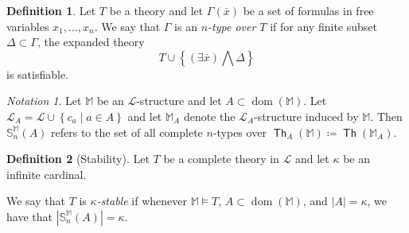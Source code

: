 \documentclass[10pt,letterpaper,cm]{nupset}
\theoremstyle{definition}
\newtheorem{definition}{Definition}
\theoremstyle{theorem}
\theoremstyle{remark}
\newtheorem*{notation}{Notation}
\newcommand{\M}{\mathbb M}
\renewcommand{\L}{\mathcal L}
\renewcommand{\S}{\mathbb S}
\newcommand{\1}{\mathbb{1}}
\newcommand{\0}{\vec 0}
\DeclareMathOperator{\dom}{dom}
\DeclareMathOperator{\thh}{\mathsf{Th}}
\begin{document}
\begin{definition}
Let $T$ be a theory and let $\Gamma(\bar{x})$ be a set of formulas in free variables $x_1, \ldots, x_n$. We say that $\Gamma$ is an \textit{$n$-type over $T$} if for any finite subset $\Delta \subset \Gamma$, the expanded theory $$T\cup \left\{\left(\exists{\bar{x}}\right)\bigwedge{\Delta}\right\}$$ is satisfiable.
\end{definition}

\begin{notation}
Let $\M$ be an $\L$-structure and let $A\subset \dom(\M)$. Let $\L_A = \L \cup \left\{c_a \mid a \in A\right\}$ and let $\M_A$ denote the  $\L_A$-structure induced by $\M$.  Then  $\S_n^{\M}(A)$ refers to the set of all complete $n$-types over $\thh_A(\M) \coloneqq \thh(\M_A)$.
\end{notation}
\begin{definition}[Stability] Let $T$ be a complete theory in $\L$ and let $\kappa$ be an infinite cardinal.  
\begin{comment}
\begin{enumerate}[label=(\roman*)]
\item Let $p$ be the set of all $\L_A$ formulas in free variables $x_1, \ldots, x_n$. We say that $p$ is \textit{$n$-type} if $p \cup \thh_A(\M)$ is satisfiable.

In this case, we call $p$ \textit{complete} if $\theta \in p$ or $\neg{\theta}$ for any $\L_A$-formula $\theta$ with free variables among $x_1, \ldots, x_n$. 
\item
\end{enumerate}
\end{comment}
We say that $T$ is \textit{$\kappa$-stable} if whenever $\M \models T$, $A\subset \dom(\M)$, and $\left\lvert{A}\right\rvert = \kappa$, we have that $\left\lvert{\S_n^{\M}(A)}\right\rvert = \kappa$.
\end{definition} 

\pagebreak
\end{document}

